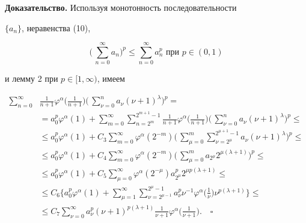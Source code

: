 {\bf Доказательство.} Используя монотонность последовательности


$\{a_n\}$, неравенства (10),


\begin{equation}


\biggl(\,\sum^\infty_{n=0}a_n \biggr)^p\le


\sum^\infty_{n=0}a^p_n


\text{ при }p\in(0,1)


\end{equation}


и лемму 2 при $p\in[1,\infty)$, имеем


\begin{align*}


\sum^\infty_{n=0}&\frac{1}{n+1}\varphi^\alpha


\biggl(\frac{1}{n+1} \biggr)\biggl(\,\sum^n_{\nu=0}a_\nu


(\nu+1)^\lambda\biggr)^p= \\


&=a^p_0\varphi^\alpha(1)+\sum^\infty_{m=0}


\sum^{2^{m+1}-1}_{n=2^m}\frac{1}{n+1}\varphi^\alpha


\biggl(\frac{1}{n+1} \biggr)\biggl(\,\sum^n_{\nu=0}a_\nu


(\nu+1)^\lambda\biggr)^p\le \\


&\le a^p_0\varphi^\alpha(1)+C_3\sum^\infty_{m=0}


\varphi^\alpha(2^{-m})\biggl(\,\sum^m_{\mu=0}


\sum^{2^{\mu+1}-1}_{\nu=2^\mu}a_\nu(\nu+1)^\lambda


\biggr)^p\le\\


&\le a^p_0\varphi^\alpha(1)+C_4\sum^\infty_{m=0}


\varphi^\alpha(2^{-m})\biggl(\,\sum^m_{\mu=0}a_{2^\mu}


2^{\mu(\lambda+1)}\biggr)^p\le \\


&\le a^p_0\varphi^\alpha(1)+C_5\sum^\infty_{\mu=0}


\varphi^\alpha(2^{-\mu})a^p_{2^\mu}2^{\mu p(\lambda+1)}\le \\


&\le C_6\biggl\{a^p_0\varphi^\alpha(1)+


\sum^\infty_{\mu=1}\sum^{2^\mu-1}_{\nu=2^{\mu-1}}a^p_\nu


\nu^{-1}\varphi^\alpha\biggl(\frac{1}{\nu} \biggr)


\nu^{p(\lambda+1)}\biggr\}\le \\


&\le C_7\sum^\infty_{\nu=0}a^p_\nu(\nu+1)^{p(\lambda+1)}


\frac{1}{\nu+1}\varphi^\alpha\biggl(\frac{1}{\nu+1} \biggr).


\quad\square


\end{align*}





